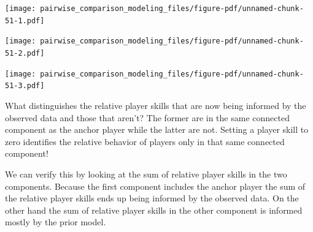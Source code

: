 \documentclass[
  letterpaper,
  DIV=11,
  numbers=noendperiod]{scrartcl}
\begin{document}
\texttt{[image: pairwise\_comparison\_modeling\_files/figure-pdf/unnamed-chunk-51-1.pdf]}

\texttt{[image: pairwise\_comparison\_modeling\_files/figure-pdf/unnamed-chunk-51-2.pdf]}

\texttt{[image: pairwise\_comparison\_modeling\_files/figure-pdf/unnamed-chunk-51-3.pdf]}

What distinguishes the relative player skills that are now being
informed by the observed data and those that aren't? The former are in
the same connected component as the anchor player while the latter are
not. Setting a player skill to zero identifies the relative behavior of
players only in that same connected component!

We can verify this by looking at the sum of relative player skills in
the two components. Because the first component includes the anchor
player the sum of the relative player skills ends up being informed by
the observed data. On the other hand the sum of relative player skills
in the other component is informed mostly by the prior model.
\end{document}
